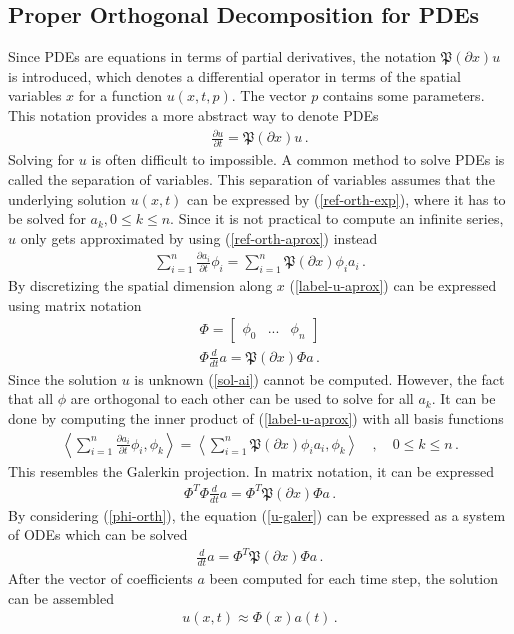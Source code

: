 \subsection{Proper Orthogonal Decomposition for PDEs}
Since PDEs are equations in terms of partial derivatives, the notation \(\mathfrak{P}(\partial x) u\) is introduced, which denotes a differential operator in terms of the spatial variables \(x\) for a function \(u(x,t,p)\).
The vector \(p\) contains some parameters.
This notation provides a more abstract way to denote PDEs \cite{Gustafsson2011f}
\begin{gather}
\frac{\partial u}{\partial t} = \mathfrak{P}(\partial x) u \,.
\end{gather}
Solving for \(u\) is often difficult to impossible.
A common method to solve PDEs is called the separation of variables.
This separation of variables assumes that the underlying solution \(u(x, t)\) can be expressed by (\ref{ref-orth-exp}), where it has to be solved for \(a_k, 0 \leq k \leq n\).
Since it is not practical to compute an infinite series, \(u\) only gets approximated by using (\ref{ref-orth-aprox}) instead
\begin{gather}
\sum_{i = 1} ^{n} \frac{\partial a_i}{\partial t} \phi_i = \sum_{i = 1} ^{n} \mathfrak{P}(\partial x) \phi_i a_i \,. \label{label-u-aprox} 
\end{gather}
By discretizing the spatial dimension along \(x\) (\ref{label-u-aprox}) can be expressed using matrix notation
\begin{gather}
\Phi = \begin{bmatrix}
\phi_0 & ... & \phi_n
\end{bmatrix} \label{mat-phi}\\
\Phi \frac{d}{dt}a = \mathfrak{P}(\partial x) \Phi a \,.
\end{gather}
Since the solution \(u\) is unknown (\ref{sol-ai}) cannot be computed.
However, the fact that all \(\phi\) are orthogonal to each other can be used to solve for all \(a_k\).
It can be done by computing the inner product of (\ref{label-u-aprox}) with all basis functions
\begin{gather}
\left\langle \sum_{i = 1} ^{n} \frac{\partial a_i}{\partial t} \phi_i, \phi_k \right\rangle = \left\langle\sum_{i = 1} ^{n} \mathfrak{P}(\partial x) \phi_i a_i, \phi_k \right\rangle \quad, \quad 0 \leq k \leq n \,. \label{u-galer}
\end{gather}
This resembles the Galerkin projection.
In matrix notation, it can be expressed
\begin{gather}
\Phi^{T}\Phi \frac{d}{dt}a = \Phi^{T}\mathfrak{P}(\partial x) \Phi a \,.
\end{gather}
By considering (\ref{phi-orth}), the equation (\ref{u-galer}) can be expressed as a system of ODEs which can be solved
\begin{gather}
\frac{d}{dt} a = \Phi^{T}\mathfrak{P}(\partial x) \Phi a \,.
\end{gather}
After the vector of coefficients \(a\) been computed for each time step, the solution can be assembled \cite{brunton_kutz_2019c}
\begin{gather}
u(x, t) \approx \Phi(x)a(t) \,. \label{u-aprox-pod}
\end{gather} 
